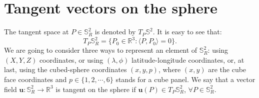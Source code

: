 \section{Tangent vectors on the sphere}
\label{cs-tgvectors}
The tangent space at $P \in \mathbb{S}^2_R$ is denoted by $T_P \mathbb{S}^2$.
It is easy to see that:
\begin{equation*}
	T_P\mathbb{S}^2_R = \{P_0 \in \mathbb{R}^3: \langle P,P_0\rangle = 0\}.
\end{equation*}
We are going to consider three ways to represent an element of $\mathbb{S}_R^2$:
using $(X,Y,Z)$ coordinates, or using $(\lambda, \phi)$
latitude-longitude coordinates, or, at last, using the cubed-sphere
coordinates $(x,y,p)$, where $(x,y)$ are the cube face coordinates and 
$p \in \{1,2,\cdots, 6\}$ stands for a cube panel.
We say that a vector field $\boldsymbol{u}: \mathbb{S}^2_R \to 
\mathbb{R}^3$ is tangent on  the sphere if
$\boldsymbol{u}(P) \in T_P\mathbb{S}^2_R$, $\forall P \in \mathbb{S}^2_R$.

